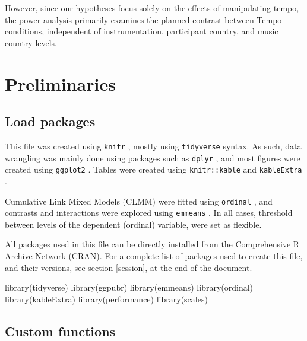 \documentclass[
  bookmarksnumbered]{article}
\newenvironment{Shaded}{\begin{snugshade}}{\end{snugshade}}
\newcommand{\FunctionTok}[1]{\textcolor[rgb]{0.94,0.94,0.56}{#1}}
\newcommand{\NormalTok}[1]{\textcolor[rgb]{0.80,0.80,0.80}{#1}}
\begin{document}
However, since our hypotheses focus solely on the effects of manipulating tempo, the power analysis primarily examines the planned contrast between Tempo conditions, independent of instrumentation, participant country, and music country levels.

\hypertarget{preliminaries}{%
\section{Preliminaries}\label{preliminaries}}

\hypertarget{load-packages}{%
\subsection{Load packages}\label{load-packages}}

This file was created using \texttt{knitr} \autocite{knitrcit}, mostly using \texttt{tidyverse} \autocite{tidyversecit} syntax. As such, data wrangling was mainly done using packages such as \texttt{dplyr} \autocite{dplyrcit}, and most figures were created using \texttt{ggplot2} \autocite{ggplotcit}. Tables were created using \texttt{knitr::kable} and \texttt{kableExtra} \autocite{kableExtracit}.

Cumulative Link Mixed Models (CLMM) were fitted using \texttt{ordinal} \autocite{ordinalcit}, and contrasts and interactions were explored using \texttt{emmeans} \autocite{emmeanscit}. In all cases, threshold between levels of the dependent (ordinal) variable, were set as flexible.

All packages used in this file can be directly installed from the Comprehensive R Archive Network (\href{https://cran.r-project.org/}{CRAN}). For a complete list of packages used to create this file, and their versions, see section \ref{session}, at the end of the document.

\begin{Shaded}
\begin{Highlighting}[]
\FunctionTok{library}\NormalTok{(tidyverse)}
\FunctionTok{library}\NormalTok{(ggpubr)}
\FunctionTok{library}\NormalTok{(emmeans)}
\FunctionTok{library}\NormalTok{(ordinal)}
\FunctionTok{library}\NormalTok{(kableExtra)}
\FunctionTok{library}\NormalTok{(performance)}
\FunctionTok{library}\NormalTok{(scales)}
\end{Highlighting}
\end{Shaded}

\hypertarget{custom-functions}{%
\subsection{Custom functions}\label{custom-functions}}
\end{document}
